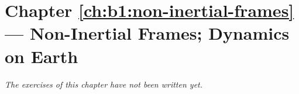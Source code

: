 \section*{Chapter \ref{ch:b1:non-inertial-frames} --- Non-Inertial Frames; Dynamics on Earth}


\emph{The exercises of this chapter have not been written yet.}
